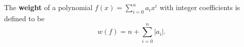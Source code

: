 The \textbf{weight} of a polynomial $f(x) = \sum_{i=0}^{n} a_i x^i$ with integer coefficients is defined to be
$$w(f) = n + \sum_{i=0}^{n} |a_i|.$$

